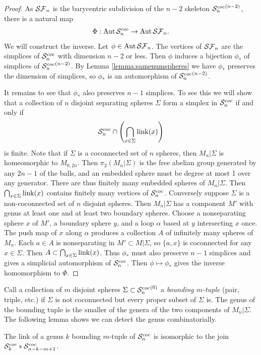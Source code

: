 \begin{proof}
As ${ \mathcal {SF}_n }$ is the barycentric subdivision of the $n-2$ skeleton ${{ \mathcal S^{{coc}}_{n} }}^{(n-2)}$, there is a natural map
$$\Phi: \operatorname{Aut}{{ \mathcal S^{{coc}}_{n} }} \to \operatorname{Aut}{{ \mathcal {SF}_n }}.$$ We will construct the inverse. Let $\phi \in \operatorname{Aut}{{ \mathcal {SF}_n }}$.
The vertices of ${ \mathcal {SF}_n }$ are the simplices of ${ \mathcal S^{{coc}}_{n} }$ with dimension $n-2$ or less.
Then $\phi$ induces a bijection $\phi_\ast$ of simplices of ${{ \mathcal S^{{coc}}_{n} }}^{(n-2)}$.
By Lemma \ref{lemma:samenumspheres} we have $\phi_\ast$ preserves the dimension of simplices, so $\phi_\ast$ is an automorphism of ${{ \mathcal S^{{coc}}_{n} }}^{(n-2)}$.

It remains to see that $\phi_\ast$ also preserves $n-1$ simplices.
To see this we will show that a collection of $n$ disjoint separating spheres $\Sigma$ form a simplex in ${ \mathcal S^{{coc}}_{n} }$ if and only if
$${ \mathcal S^{{coc}}_{n} } \cap  \left ( \bigcap_{x \in \Sigma} \operatorname{link}(x) \right )$$
is finite.
Note that if $\Sigma$ is a coconnected set of $n$ spheres, then $M_n|\Sigma$ is homeomorphic to $M_{0,2n}$. Then $\pi_2(M_n|\Sigma)$ is the free abelian group generated by any $2n-1$ of the balls, and an embedded sphere must be degree at most 1 over any generator.
There are thus finitely many  embedded spheres of $M_n|\Sigma$.
Then $\bigcap_{x \in \Sigma} \operatorname{link} (x)$ contains finitely many vertices of ${ \mathcal S^{{coc}}_{n} }$.
Conversely suppose $\Sigma$ is a non-coconnected set of $n$ disjoint spheres.
Then $M_n|\Sigma$ has a component $M'$ with genus at least one and at least two boundary spheres.
Choose a nonseparating sphere $x$ of $M'$, a boundary sphere $y$, and a loop $\alpha$ based at $y$ intersecting $x$ once. The push map of $x$ along $\alpha$ produces a collection $A$ of infinitely many spheres of $M_n$. Each $a \in A$ is nonseparating in $M' \subset M|\Sigma$, so $\{a,x\}$ is coconnected for any $x \in \Sigma$. Then  $A\subset \bigcap_{x \in \Sigma} \operatorname{link} (x)$.
Thus $\phi_\ast$ must also preserve $n-1$ simplices and gives a simplicial automorphism of ${ \mathcal S^{{coc}}_{n} }$.
Then $\phi \mapsto \phi_\ast$ gives the inverse homomorphism to $\Phi$.
\end{proof}



Call a collection of $m$ disjoint spheres $\Sigma \subset {{\ensuremath{ \mathcal S^{{coc}}_{n} }}}^{(0)}$ a \emph{bounding $m$-tuple} (pair, triple, etc.) if $\Sigma$ is not coconnected but every proper subset of $\Sigma$ is.
The genus of the bounding tuple is the smaller of the genera of the two components of $M_n|\Sigma$.
The following lemma shows we can detect the genus combinatorially.

\begin{lemma}
The link of a genus $k$ bounding $m$-tuple of ${ \mathcal S^{{coc}}_{n} }$ is isomorphic to the join ${ \mathcal S^{{coc}}_{k} } \ast {\ensuremath{ \mathcal S^{{coc}}_{n-k-m+1} }}$.
\label{lemma:itwasseven}
\end{lemma}

